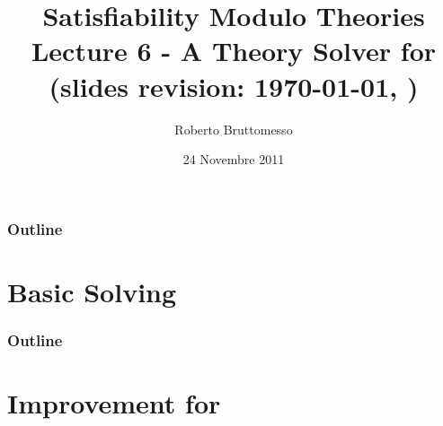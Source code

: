 \documentclass[xcolor=dvipsnames
              ]{beamer}
\title[\tsolver for \Lra]{Satisfiability Modulo Theories\\ Lecture 6 - A Theory Solver for \Lra \\ {\tiny (slides revision: \today, \currenttime)}}
\author[R. Bruttomesso]{\large Roberto Bruttomesso}
\date{24 Novembre 2011}
\institute[SMT]{\large Seminario di Logica Matematica \\ (Corso Prof. Silvio Ghilardi)}
\begin{document}
\frame{\titlepage}

\begin{frame}
  \frametitle{Outline}
  \tableofcontents
\end{frame}

\section{Basic Solving}





\begin{frame}
  \frametitle{Outline}
  \tableofcontents
\end{frame}

\section{Improvement for \tsolver}




\end{document}
